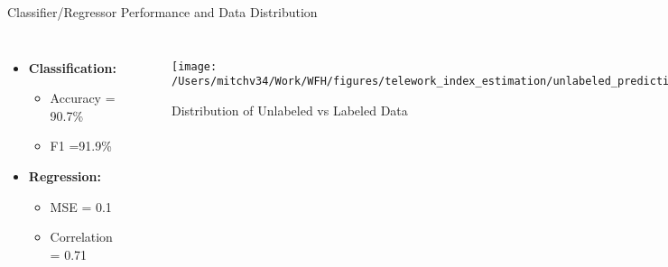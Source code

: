 \documentclass[aspectratio=1610]{beamer}
\begin{document}
\begin{frame}[label=empiric_remote_index2]{Classifier/Regressor Performance and Data Distribution}
        \begin{columns}
            {\small %
                \begin{itemize}\small
                    \item \textbf{Classification:} 
                    \begin{itemize}\footnotesize
                        \item Accuracy = 90.7\%
                        \item F1 =91.9\%
                    \end{itemize}
                    \item \textbf{Regression:}
                    \begin{itemize}\footnotesize
                        \item MSE = 0.1
                        \item Correlation = 0.71
                    \end{itemize}
                \end{itemize}
            }
                \begin{figure}
                    \centering
                    \texttt{[image: /Users/mitchv34/Work/WFH/figures/telework\_index\_estimation/unlabeled\_prediction.pdf]}
                    \caption{Distribution of Unlabeled vs Labeled Data}
                \end{figure}
        \end{columns}
    \end{frame}
            
    
    
\end{document}
